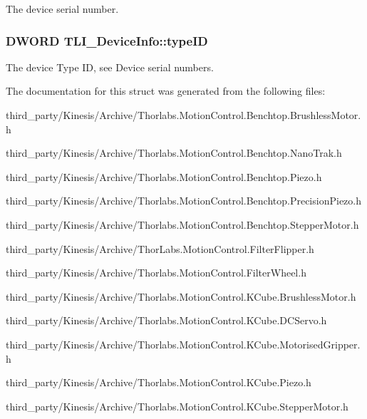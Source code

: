 The device serial number. 

\subsubsection[{\texorpdfstring{type\+ID}{typeID}}]{\setlength{\rightskip}{0pt plus 5cm}D\+W\+O\+RD T\+L\+I\+\_\+\+Device\+Info\+::type\+ID}\hypertarget{struct_t_l_i___device_info_af48200700520b9f35e899443b91d4fb0}{}\label{struct_t_l_i___device_info_af48200700520b9f35e899443b91d4fb0}


The device Type ID, see Device serial numbers. 



The documentation for this struct was generated from the following files\+:\begin{DoxyCompactItemize}
\item 
third\+\_\+party/\+Kinesis/\+Archive/Thorlabs.\+Motion\+Control.\+Benchtop.\+Brushless\+Motor.\+h\item 
third\+\_\+party/\+Kinesis/\+Archive/Thorlabs.\+Motion\+Control.\+Benchtop.\+Nano\+Trak.\+h\item 
third\+\_\+party/\+Kinesis/\+Archive/Thorlabs.\+Motion\+Control.\+Benchtop.\+Piezo.\+h\item 
third\+\_\+party/\+Kinesis/\+Archive/Thorlabs.\+Motion\+Control.\+Benchtop.\+Precision\+Piezo.\+h\item 
third\+\_\+party/\+Kinesis/\+Archive/Thorlabs.\+Motion\+Control.\+Benchtop.\+Stepper\+Motor.\+h\item 
third\+\_\+party/\+Kinesis/\+Archive/Thor\+Labs.\+Motion\+Control.\+Filter\+Flipper.\+h\item 
third\+\_\+party/\+Kinesis/\+Archive/Thorlabs.\+Motion\+Control.\+Filter\+Wheel.\+h\item 
third\+\_\+party/\+Kinesis/\+Archive/Thorlabs.\+Motion\+Control.\+K\+Cube.\+Brushless\+Motor.\+h\item 
third\+\_\+party/\+Kinesis/\+Archive/Thorlabs.\+Motion\+Control.\+K\+Cube.\+D\+C\+Servo.\+h\item 
third\+\_\+party/\+Kinesis/\+Archive/Thorlabs.\+Motion\+Control.\+K\+Cube.\+Motorised\+Gripper.\+h\item 
third\+\_\+party/\+Kinesis/\+Archive/Thorlabs.\+Motion\+Control.\+K\+Cube.\+Piezo.\+h\item 
third\+\_\+party/\+Kinesis/\+Archive/Thorlabs.\+Motion\+Control.\+K\+Cube.\+Stepper\+Motor.\+h\item 

\end{DoxyCompactItemize}
